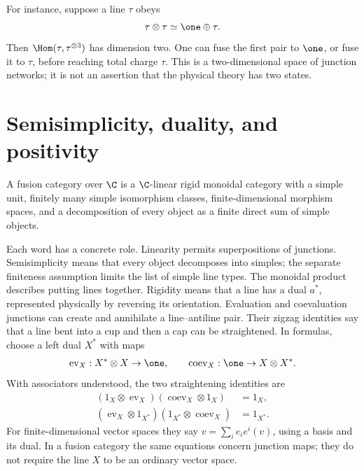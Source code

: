 For instance, suppose a line $\tau$ obeys
\begin{equation}
 \tau\otimes\tau\simeq\one\oplus\tau.
 \label{eq:fibonacci-rule}
\end{equation}
Then $\Hom(\tau,\tau^{\otimes3})$ has dimension two.  One can fuse
the first pair to $\one$, or fuse it to $\tau$, before reaching total
charge $\tau$.  This is a two-dimensional space of junction networks;
it is not an assertion that the physical theory has two states.

\section{Semisimplicity, duality, and positivity}

\begin{definition}
A fusion category over $\C$ is a $\C$-linear rigid monoidal category
with a simple unit, finitely many simple isomorphism classes,
finite-dimensional morphism spaces, and a decomposition of every
object as a finite direct sum of simple objects.
\end{definition}

Each word has a concrete role.  Linearity permits superpositions of
junctions. Semisimplicity means that every object decomposes into
simples; the separate finiteness assumption limits the list of
simple line types.
The monoidal product describes putting lines together.  Rigidity means
that a line has a dual $a^*$, represented physically by reversing its
orientation.  Evaluation and coevaluation junctions can create and
annihilate a line--antiline pair.  Their zigzag identities say that a
line bent into a cup and then a cap can be straightened.
In formulas, choose a left dual $X^*$ with maps
\[
 \operatorname{ev}_X:X^*\otimes X\to\one,
 \qquad \operatorname{coev}_X:\one\to X\otimes X^*.
\]
With associators understood, the two straightening identities are
\begin{align*}
 (1_X\otimes\operatorname{ev}_X)
 (\operatorname{coev}_X\otimes1_X)&=1_X,\\
 (\operatorname{ev}_X\otimes1_{X^*})
 (1_{X^*}\otimes\operatorname{coev}_X)&=1_{X^*}.
\end{align*}
For finite-dimensional vector spaces they say
$v=\sum_i e_i e^i(v)$, using a basis and its dual.
In a fusion category the same equations concern junction maps;
they do not require the line $X$ to be an ordinary vector space.

